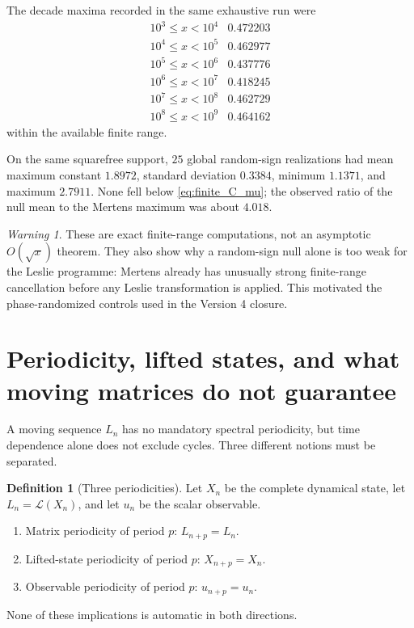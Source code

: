 \documentclass[11pt]{amsart}
\numberwithin{equation}{section}
\theoremstyle{plain}
\theoremstyle{definition}
\newtheorem{definition}[theorem]{Definition}
\theoremstyle{remark}
\newtheorem{warning}[theorem]{Warning}
\begin{document}
The decade maxima recorded in the same exhaustive run were
\[
\begin{array}{c|c}
10^3\le x<10^4 & 0.472203\\
10^4\le x<10^5 & 0.462977\\
10^5\le x<10^6 & 0.437776\\
10^6\le x<10^7 & 0.418245\\
10^7\le x<10^8 & 0.462729\\
10^8\le x<10^9 & 0.464162
\end{array}
\]
within the available finite range.

On the same squarefree support, $25$ global random-sign realizations had mean maximum constant
$1.8972$, standard deviation $0.3384$, minimum $1.1371$, and maximum $2.7911$.
None fell below \eqref{eq:finite_C_mu}; the observed ratio of the null mean to the Mertens
maximum was about $4.018$.

\begin{warning}
\label{warn:finite_not_asymptotic}
These are exact finite-range computations, not an asymptotic $O(\sqrt x)$ theorem.  They also show
why a random-sign null alone is too weak for the Leslie programme: Mertens already has unusually
strong finite-range cancellation before any Leslie transformation is applied.  This motivated the
phase-randomized controls used in the Version 4 closure.
\end{warning}


\section{Periodicity, lifted states, and what moving matrices do not guarantee}
\label{sec:lifted_periodicity}

A moving sequence $L_n$ has no mandatory spectral periodicity, but time dependence alone does not
exclude cycles.  Three different notions must be separated.

\begin{definition}[Three periodicities]
\label{def:three_periodicities}
Let $X_n$ be the complete dynamical state, let $L_n=\mathcal L(X_n)$, and let $u_n$ be the scalar
observable.
\begin{enumerate}
\item Matrix periodicity of period $p$: $L_{n+p}=L_n$.
\item Lifted-state periodicity of period $p$: $X_{n+p}=X_n$.
\item Observable periodicity of period $p$: $u_{n+p}=u_n$.
\end{enumerate}
None of these implications is automatic in both directions.
\end{definition}
\end{document}
